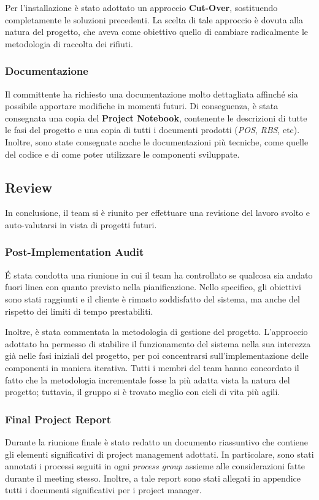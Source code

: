 Per l'installazione è stato adottato un approccio \textbf{Cut-Over}, sostituendo completamente le soluzioni precedenti. La scelta di tale approccio è dovuta alla natura del progetto, che aveva come obiettivo quello di cambiare radicalmente le metodologia di raccolta dei rifiuti.

\subsubsection{Documentazione}
Il committente ha richiesto una documentazione molto dettagliata affinché sia possibile apportare modifiche in momenti futuri. Di conseguenza, è stata consegnata una copia del \textbf{Project Notebook}, contenente le descrizioni di tutte le fasi del progetto e una copia di tutti i documenti prodotti (\textit{POS}, \textit{RBS}, etc). Inoltre, sono state consegnate anche le documentazioni più tecniche, come quelle del codice e di come poter utilizzare le componenti sviluppate.

\subsection{Review}
In conclusione, il team si è riunito per effettuare una revisione del lavoro svolto e auto-valutarsi in vista di progetti futuri.

\subsubsection{Post-Implementation Audit}
\'E stata condotta una riunione in cui il team ha controllato se qualcosa sia andato fuori linea con quanto previsto nella pianificazione. Nello specifico, gli obiettivi sono stati raggiunti e il cliente è rimasto soddisfatto del sistema, ma anche del rispetto dei limiti di tempo prestabiliti.

Inoltre, è stata commentata la metodologia di gestione del progetto. L'approccio adottato ha permesso di stabilire il funzionamento del sistema nella sua interezza già nelle fasi iniziali del progetto, per poi concentrarsi sull'implementazione delle componenti in maniera iterativa. Tutti i membri del team hanno concordato il fatto che la metodologia incrementale fosse la più adatta vista la natura del progetto; tuttavia, il gruppo si è trovato meglio con cicli di vita più agili.

\subsubsection{Final Project Report}
Durante la riunione finale è stato redatto un documento riassuntivo che contiene gli elementi significativi di project management adottati. In particolare, sono stati annotati i processi seguiti in ogni \textit{process group} assieme alle considerazioni fatte durante il meeting stesso. Inoltre, a tale report sono stati allegati in appendice tutti i documenti significativi per i project manager.